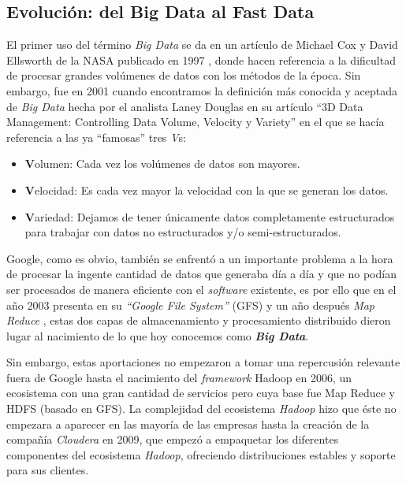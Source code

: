 \subsection{Evolución: del Big Data al Fast Data}

El primer uso del término  \textit{Big Data}  se da en un artículo de Michael Cox y David Ellsworth de la NASA publicado en 1997 \cite{Cox_1997}, donde hacen referencia a la dificultad de procesar grandes volúmenes de datos con los métodos de la época. Sin embargo, fue en 2001 cuando encontramos la definición más conocida y aceptada de \textit{Big Data} hecha por el analista Laney Douglas en su artículo ``3D Data Management: Controlling Data Volume, Velocity y Variety'' \cite{laneay_2013} en el que se hacía referencia a las ya ``famosas'' tres \textit{V}s:

\begin{itemize}
	\item \textbf{V}olumen:  Cada vez los volúmenes de datos son mayores.
	\item \textbf{V}elocidad: Es cada vez mayor la velocidad con la que se generan los datos.  
	\item \textbf{V}ariedad: Dejamos de tener únicamente datos completamente estructurados para trabajar con datos no estructurados y/o  semi-estructurados. 
\end{itemize} 


Google, como es obvio, también  se enfrentó a un importante problema a la hora de procesar la ingente cantidad de datos que generaba día a día y que no podían ser procesados de manera eficiente con el \textit{software} existente, es por ello que en el año 2003 presenta en \cite{GFS} su  \textit{``Google File System''} (GFS) y un año después \textit{Map Reduce} \cite{MapReduce}, estas dos capas de almacenamiento y procesamiento distribuido dieron lugar al nacimiento de lo que hoy conocemos como \textit{\textbf{Big Data}}.

Sin embargo, estas aportaciones no empezaron a tomar una repercusión relevante fuera de Google hasta el nacimiento del \textit{framework} Hadoop en 2006, un ecosistema con una gran cantidad de servicios pero cuya base fue Map Reduce y HDFS (basado en GFS). La complejidad del ecosistema \textit{Hadoop} hizo que éste no empezara a aparecer en las mayoría de las empresas hasta la creación de la compañía \textit{Cloudera} en 2009, que empezó a empaquetar los diferentes componentes del ecosistema \textit{Hadoop}, ofreciendo distribuciones estables y soporte para sus clientes. 


